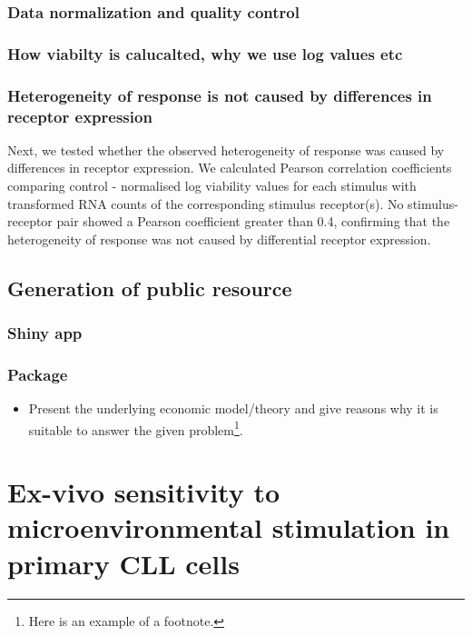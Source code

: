 \documentclass[11pt, a4paper, twosided]{book}
\providecommand{\tightlist}{%
  \setlength{\itemsep}{0pt}\setlength{\parskip}{0pt}}
\begin{document}
\hypertarget{data-normalization-and-quality-control}{%
\subsection{Data normalization and quality control}\label{data-normalization-and-quality-control}}

\hypertarget{how-viabilty-is-calucalted-why-we-use-log-values-etc}{%
\subsection{How viabilty is calucalted, why we use log values etc}\label{how-viabilty-is-calucalted-why-we-use-log-values-etc}}

\hypertarget{heterogeneity-of-response-is-not-caused-by-differences-in-receptor-expression}{%
\subsection{Heterogeneity of response is not caused by differences in receptor expression}\label{heterogeneity-of-response-is-not-caused-by-differences-in-receptor-expression}}

Next, we tested whether the observed heterogeneity of response was caused by differences in receptor expression. We calculated Pearson correlation coefficients comparing control - normalised log viability values for each stimulus with transformed RNA counts of the corresponding stimulus receptor(s). No stimulus-receptor pair showed a Pearson coefficient greater than 0.4, confirming that the heterogeneity of response was not caused by differential receptor expression.



\hypertarget{generation-of-public-resource}{%
\section{Generation of public resource}\label{generation-of-public-resource}}

\hypertarget{shiny-app}{%
\subsection{Shiny app}\label{shiny-app}}

\hypertarget{package}{%
\subsection{Package}\label{package}}
\begin{itemize}
\tightlist
\item
  Present the underlying economic model/theory and give reasons why it is
  suitable to answer the given problem\footnote{Here is an example of a footnote.}.
\end{itemize}
\hypertarget{chapter4}{%
\chapter{Ex-vivo sensitivity to microenvironmental stimulation in primary CLL cells}\label{chapter4}}
\end{document}

